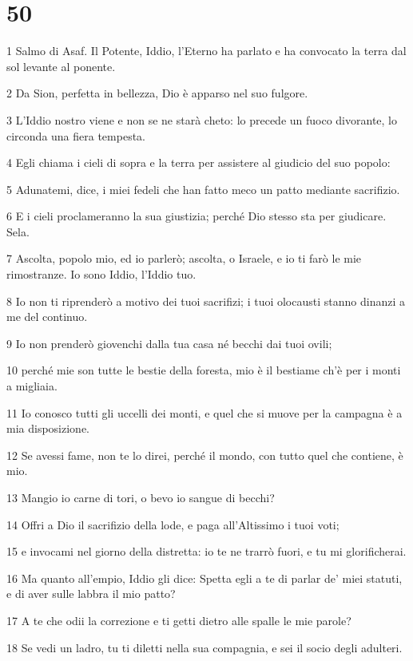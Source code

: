 \chapter{50}

\par 1 Salmo di Asaf. Il Potente, Iddio, l'Eterno ha parlato e ha convocato la terra dal sol levante al ponente.
\par 2 Da Sion, perfetta in bellezza, Dio è apparso nel suo fulgore.
\par 3 L'Iddio nostro viene e non se ne starà cheto: lo precede un fuoco divorante, lo circonda una fiera tempesta.
\par 4 Egli chiama i cieli di sopra e la terra per assistere al giudicio del suo popolo:
\par 5 Adunatemi, dice, i miei fedeli che han fatto meco un patto mediante sacrifizio.
\par 6 E i cieli proclameranno la sua giustizia; perché Dio stesso sta per giudicare. Sela.
\par 7 Ascolta, popolo mio, ed io parlerò; ascolta, o Israele, e io ti farò le mie rimostranze. Io sono Iddio, l'Iddio tuo.
\par 8 Io non ti riprenderò a motivo dei tuoi sacrifizi; i tuoi olocausti stanno dinanzi a me del continuo.
\par 9 Io non prenderò giovenchi dalla tua casa né becchi dai tuoi ovili;
\par 10 perché mie son tutte le bestie della foresta, mio è il bestiame ch'è per i monti a migliaia.
\par 11 Io conosco tutti gli uccelli dei monti, e quel che si muove per la campagna è a mia disposizione.
\par 12 Se avessi fame, non te lo direi, perché il mondo, con tutto quel che contiene, è mio.
\par 13 Mangio io carne di tori, o bevo io sangue di becchi?
\par 14 Offri a Dio il sacrifizio della lode, e paga all'Altissimo i tuoi voti;
\par 15 e invocami nel giorno della distretta: io te ne trarrò fuori, e tu mi glorificherai.
\par 16 Ma quanto all'empio, Iddio gli dice: Spetta egli a te di parlar de' miei statuti, e di aver sulle labbra il mio patto?
\par 17 A te che odii la correzione e ti getti dietro alle spalle le mie parole?
\par 18 Se vedi un ladro, tu ti diletti nella sua compagnia, e sei il socio degli adulteri.

